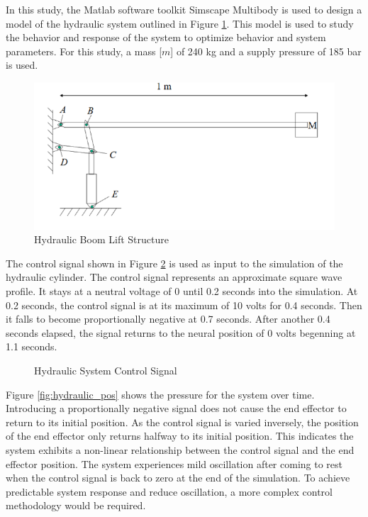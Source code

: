 In this study, the Matlab software toolkit Simscape Multibody is used to design a model of the hydraulic system outlined in Figure \ref{fig:boom_structure}. This model is used to study the behavior and response of the system to optimize behavior and system parameters. For this study, a mass [$m$] of 240 kg and a supply pressure of 185 bar is used.

\begin{figure}[H]
    \includegraphics[width=\textwidth]{1_hydraulic_sim/BoomStructure.PNG}
    \caption{Hydraulic Boom Lift Structure}
    \label{fig:boom_structure}
\end{figure}


The control signal shown in Figure \ref{fig:hydraulic_cs} is used as input to the simulation of the hydraulic cylinder. The control signal represents an approximate square wave profile. It stays at a neutral voltage of 0 until 0.2 seconds into the simulation. At 0.2 seconds, the control signal is at its maximum of 10 volts for 0.4 seconds. Then it falls to become proportionally negative at 0.7 seconds. After another 0.4 seconds elapsed, the signal returns to the neural position of 0 volts begenning at 1.1 seconds.

\begin{figure}[H]
    
    \caption{Hydraulic System Control Signal}
    \label{fig:hydraulic_cs}
\end{figure}

Figure \ref{fig:hydraulic_pos} shows the pressure for the system over time. Introducing a proportionally negative signal does not cause the end effector to return to its initial position. As the control signal is varied inversely, the position of the end effector only returns halfway to its initial position. This indicates the system exhibits a non-linear relationship between the control signal and the end effector position. The system experiences mild oscillation after coming to rest when the control signal is back to zero at the end of the simulation. To achieve predictable system response and reduce oscillation, a more complex control methodology would be required.

